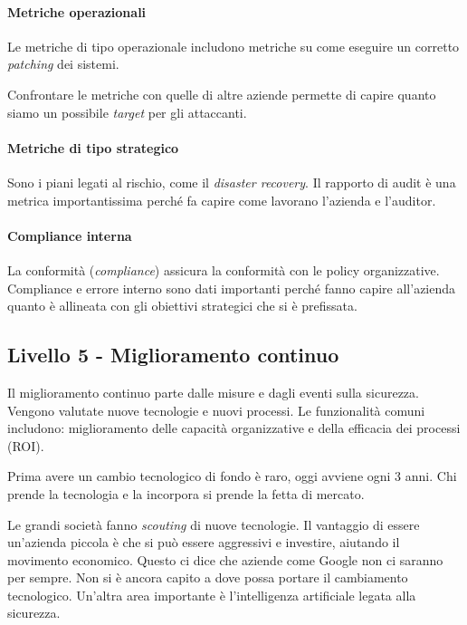 \paragraph*{Metriche operazionali}

Le metriche di tipo operazionale includono metriche su come eseguire
un corretto \textit{patching} dei sistemi.

Confrontare le metriche con quelle di altre aziende permette di capire quanto
siamo un possibile \textit{target} per gli attaccanti.

\paragraph*{Metriche di tipo strategico}

Sono i piani legati al rischio, come il \textit{disaster recovery}.
Il rapporto di audit è una metrica importantissima perché fa capire come 
lavorano l'azienda e l'auditor.

\paragraph*{Compliance interna}

La conformità (\textit{compliance}) assicura la conformità con le policy 
organizzative. Compliance e errore interno sono dati importanti perché 
fanno capire all'azienda quanto è allineata con gli obiettivi strategici che 
si è prefissata.


\subsection{Livello 5 - Miglioramento continuo}

Il miglioramento continuo parte dalle misure e dagli eventi sulla sicurezza.
Vengono valutate nuove tecnologie e nuovi processi. Le funzionalità comuni
includono: miglioramento delle capacità organizzative e della efficacia dei
processi (ROI).

Prima avere un cambio tecnologico di fondo è raro, oggi avviene ogni 3 anni. 
Chi prende la tecnologia e la incorpora si prende la fetta di mercato.

Le grandi società fanno \textit{scouting} di nuove tecnologie. Il vantaggio di
essere un'azienda piccola è che si può essere aggressivi e investire, aiutando
il movimento economico. Questo ci dice che aziende come Google non ci
saranno per sempre. Non si è ancora capito a dove possa portare il cambiamento
tecnologico. Un'altra area importante è l'intelligenza artificiale legata
alla sicurezza.


